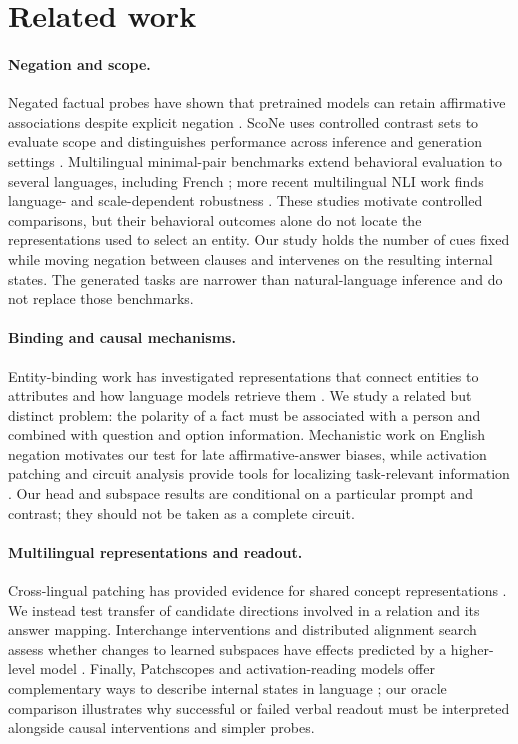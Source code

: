 \documentclass[11pt]{article}
\begin{document}
\section{Related work}
\label{sec:related}
\paragraph{Negation and scope.} Negated factual probes have shown that pretrained models can retain affirmative associations despite explicit negation \citep{kassner2020negated}. ScoNe uses controlled contrast sets to evaluate scope and distinguishes performance across inference and generation settings \citep{she2023scone}. Multilingual minimal-pair benchmarks extend behavioral evaluation to several languages, including French \citep{hartmann2021multilingual}; more recent multilingual NLI work finds language- and scale-dependent robustness \citep{vrabcova2025roots}. These studies motivate controlled comparisons, but their behavioral outcomes alone do not locate the representations used to select an entity. Our study holds the number of cues fixed while moving negation between clauses and intervenes on the resulting internal states. The generated tasks are narrower than natural-language inference and do not replace those benchmarks.

\paragraph{Binding and causal mechanisms.} Entity-binding work has investigated representations that connect entities to attributes and how language models retrieve them \citep{feng2024binding,gurarieh2026mixing}. We study a related but distinct problem: the polarity of a fact must be associated with a person and combined with question and option information. Mechanistic work on English negation \citep{zhou2026negation} motivates our test for late affirmative-answer biases, while activation patching and circuit analysis provide tools for localizing task-relevant information \citep{wang2023ioi,zhang2024patching}. Our head and subspace results are conditional on a particular prompt and contrast; they should not be taken as a complete circuit.

\paragraph{Multilingual representations and readout.} Cross-lingual patching has provided evidence for shared concept representations \citep{dumas2025tongue}. We instead test transfer of candidate directions involved in a relation and its answer mapping. Interchange interventions and distributed alignment search assess whether changes to learned subspaces have effects predicted by a higher-level model \citep{geiger2021abstraction,wu2023scale}. Finally, Patchscopes and activation-reading models offer complementary ways to describe internal states in language \citep{ghandeharioun2024patchscopes,pan2026latentqa,karvonen2026oracles}; our oracle comparison illustrates why successful or failed verbal readout must be interpreted alongside causal interventions and simpler probes.
\end{document}
